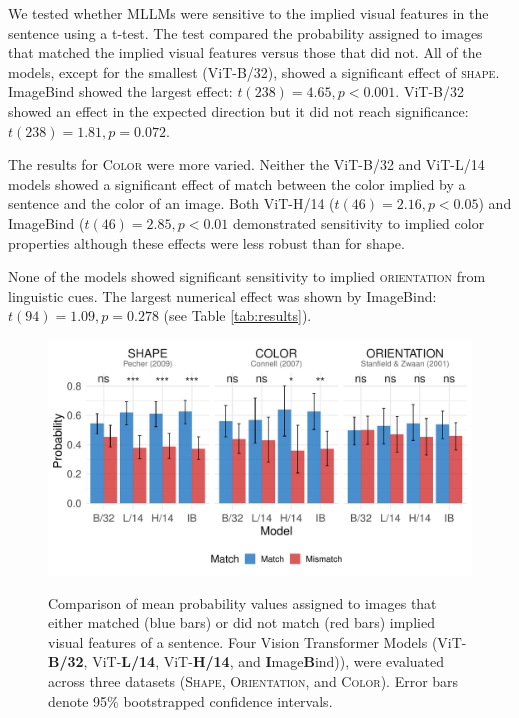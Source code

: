 \documentclass[10pt, a4paper]{article}
\begin{document}
We tested whether MLLMs were sensitive to the implied visual features in the sentence using a t-test.
The test compared the probability assigned to images that matched the implied visual features versus those that did not.
All of the models, except for the smallest (ViT-B/32), showed a significant effect of \textsc{shape}.
ImageBind showed the largest effect: $t(238) = 4.65, p < 0.001$.
ViT-B/32 showed an effect in the expected direction but it did not reach significance: $t(238) = 1.81, p = 0.072$.

The results for \textsc{Color} were more varied. Neither the ViT-B/32 and ViT-L/14 models showed a significant effect of match between the color implied by a sentence and the color of an image.
Both ViT-H/14 ($t(46) = 2.16, p < 0.05$) and ImageBind ($t(46) = 2.85, p < 0.01$ demonstrated sensitivity to implied color properties although these effects were less robust than for shape.

None of the models showed significant sensitivity to implied \textsc{orientation} from linguistic cues. The largest numerical effect was shown by ImageBind: $t(94) = 1.09, p = 0.278$ (see Table \ref{tab:results}).

\begin{figure}[ht]
    \includegraphics[width=\textwidth]{images/results.pdf}
    \label{fig:results}
    \caption{Comparison of mean probability values assigned to images that either matched (blue bars) or did not match (red bars) implied visual features of a sentence. Four Vision Transformer Models (ViT-\textbf{B/32}, ViT-\textbf{L/14}, ViT-\textbf{H/14}, and \textbf{I}mage\textbf{B}ind)), were evaluated across three datasets (\textsc{Shape}, \textsc{Orientation}, and \textsc{Color}). Error bars denote 95\% bootstrapped confidence intervals.}

\end{figure}
\end{document}
